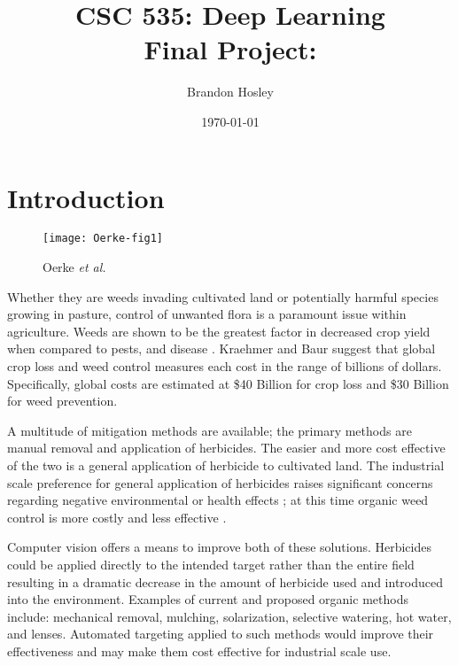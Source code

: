 \documentclass[]{article}
\title{CSC 535: Deep Learning \\ Final Project: \\ }
\author{Brandon Hosley}
\date{\today}
\begin{document}
	\maketitle
	\clearpage
	
\begin{abstract}
	
\end{abstract}
	
\section{Introduction} 

\begin{wrapfigure}{r}{0.5\textwidth}
	\begin{center}
		\texttt{[image: Oerke-fig1]}
	\end{center}
	\caption{Oerke \emph{et al.}\cite{Oerke2006}}
\end{wrapfigure}
Whether they are weeds invading cultivated land or potentially harmful species growing in pasture, control of unwanted flora is a paramount issue within agriculture.
Weeds are shown to be the greatest factor in decreased crop yield when compared to pests, and disease
\cite{Oerke2006}\cite{Rao2000}\cite{Gianessi2007}.
Kraehmer and Baur \cite{WeedAnatomy2013}
suggest that global crop loss and weed control measures each cost in the range of billions of dollars.
Specifically, global costs are estimated at 
\$40 Billion \cite{Monaco2002} for crop loss and 
\$30 Billion \cite{Lawes2008} for weed prevention.

A multitude of mitigation methods are available; 
the primary methods are manual removal and application of herbicides.
The easier and more cost effective of the two is a general application of herbicide to cultivated land.
The industrial scale preference for general application of herbicides raises significant concerns regarding negative environmental or health effects \cite{Sopena2009};
at this time organic weed control is more costly and less effective \cite{Rood2002}.

Computer vision offers a means to improve both of these solutions.
Herbicides could be applied directly to the intended target rather than the entire field resulting in a dramatic decrease in the amount of herbicide used and introduced into the environment.
Examples of current and proposed organic methods include:
mechanical removal\cite{Chicouene2007}, 
mulching\cite{Riley2004},
solarization\cite{Sahile2005}\cite{Candido2011},
selective watering, 
hot water\cite{Pinel2000}, 
and lenses\cite{Johnson1989}.
Automated targeting applied to such methods would improve their effectiveness and 
may make them cost effective for industrial scale use.
\end{document}
